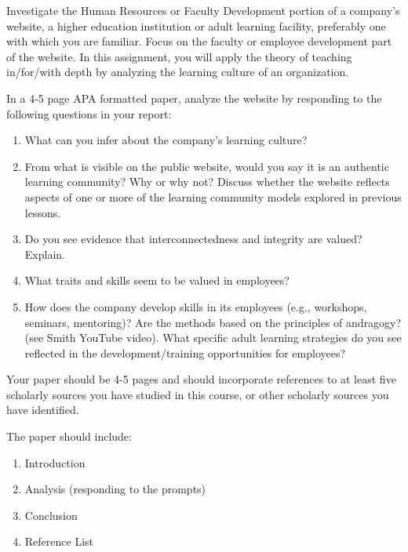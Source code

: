 \documentclass[
]{book}
\providecommand{\tightlist}{%
  \setlength{\itemsep}{0pt}\setlength{\parskip}{0pt}}
\begin{document}
\begin{assessment}
Investigate the Human Resources or Faculty Development portion of a
company's website, a higher education institution or adult learning
facility, preferably one with which you are familiar. Focus on the
faculty or employee development part of the website. In this assignment,
you will apply the theory of teaching in/for/with depth by analyzing the
learning culture of an organization.

In a 4-5 page APA formatted paper, analyze the website by responding to
the following questions in your report:

\begin{enumerate}
\def\labelenumi{\arabic{enumi}.}
\tightlist
\item
  What can you infer about the company's learning culture?\\
\item
  From what is visible on the public website, would you say it is an
  authentic learning community? Why or why not? Discuss whether the
  website reflects aspects of one or more of the learning community
  models explored in previous lessons.\\
\item
  Do you see evidence that interconnectedness and integrity are valued?
  Explain.\\
\item
  What traits and skills seem to be valued in employees?\\
\item
  How does the company develop skills in its employees (e.g., workshops,
  seminars, mentoring)? Are the methods based on the principles of
  andragogy? (see Smith YouTube video). What specific adult learning
  strategies do you see reflected in the development/training
  opportunities for employees?
\end{enumerate}

Your paper should be 4-5 pages and should incorporate references to at
least five scholarly sources you have studied in this course, or other
scholarly sources you have identified.

The paper should include:

\begin{enumerate}
\def\labelenumi{\arabic{enumi}.}
\tightlist
\item
  Introduction\\
\item
  Analysis (responding to the prompts)\\
\item
  Conclusion\\
\item
  Reference List
\end{enumerate}
\end{assessment}
\end{document}
